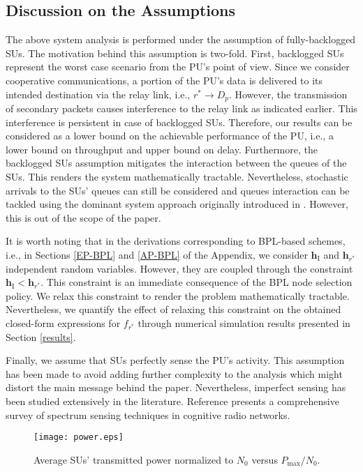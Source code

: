 \documentclass[journal,twocolumn]{IEEEtran}
\begin{document}
\vspace{-3mm}
\subsection{Discussion on the Assumptions}\label{discussion}
The above system analysis is performed under the assumption of fully-backlogged SUs. The motivation behind this assumption is two-fold. First, backlogged SUs represent the worst case scenario from the PU's point of view. Since we consider cooperative communications, a portion of the
PU's data is delivered to its intended destination via the relay link, i.e., $r^* \rightarrow D_{p}$. However, the transmission of secondary
packets causes interference to the relay link as indicated earlier. This interference is persistent in case of backlogged SUs. Therefore, our results can be considered as a lower bound on the achievable performance of the PU, i.e., a lower bound on throughput and upper bound on delay. Furthermore, the
backlogged SUs assumption mitigates the interaction between the queues of the SUs. This renders the system mathematically tractable. Nevertheless,
stochastic arrivals to the SUs' queues can still be considered and queues interaction can be tackled using the dominant system approach originally introduced in \cite{rao}. However, this is out of the scope of the paper.

It is worth noting that in the derivations corresponding to BPL-based schemes, i.e., in Sections \ref{EP-BPL} and \ref{AP-BPL} of the Appendix, we consider $\mathbf{h}_{\mathrm{I}}$ and $\mathbf{h}_{r^*}$ independent random variables. However, they are coupled through the constraint $\mathbf{h}_{\mathrm{I}} < \mathbf{h}_{r^*}$. This constraint is an immediate consequence of the BPL node selection policy. We relax this constraint to render the problem mathematically tractable. Nevertheless, we quantify the effect of relaxing this constraint on the obtained closed-form expressions for $f_{r^*}$ through numerical simulation results presented in Section \ref{results}.

Finally, we assume that SUs perfectly sense the PU's activity. This assumption has been made to avoid adding further complexity to the analysis which might distort the main message behind the paper. Nevertheless, imperfect sensing has been studied extensively in the literature. Reference \cite{yucek2009survey} presents a comprehensive survey of spectrum sensing techniques in cognitive radio networks.


\begin{figure}[t]
	\centering
	\texttt{[image: power.eps]}
	\caption{Average SUs' transmitted power normalized to $N_{0}$ versus $P_{\mathrm{max}}/N_0$.}
	\vspace{-3mm}
	\label{Fig8}
\end{figure}
\end{document}
